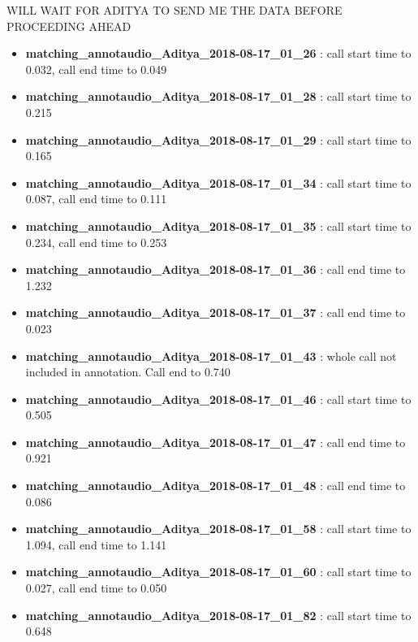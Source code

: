 \documentclass[11pt]{article}
\providecommand{\tightlist}{%
      \setlength{\itemsep}{0pt}\setlength{\parskip}{0pt}}
\begin{document}
WILL WAIT FOR ADITYA TO SEND ME THE DATA BEFORE PROCEEDING AHEAD

\begin{itemize}
\tightlist
\item
  \textbf{matching\_annotaudio\_Aditya\_2018-08-17\_01\_26} : call start
  time to 0.032, call end time to 0.049
\item
  \textbf{matching\_annotaudio\_Aditya\_2018-08-17\_01\_28} : call start
  time to 0.215
\item
  \textbf{matching\_annotaudio\_Aditya\_2018-08-17\_01\_29} : call start
  time to 0.165
\item
  \textbf{matching\_annotaudio\_Aditya\_2018-08-17\_01\_34} : call start
  time to 0.087, call end time to 0.111
\item
  \textbf{matching\_annotaudio\_Aditya\_2018-08-17\_01\_35} : call start
  time to 0.234, call end time to 0.253
\item
  \textbf{matching\_annotaudio\_Aditya\_2018-08-17\_01\_36} : call end
  time to 1.232
\item
  \textbf{matching\_annotaudio\_Aditya\_2018-08-17\_01\_37} : call end
  time to 0.023
\item
  \textbf{matching\_annotaudio\_Aditya\_2018-08-17\_01\_43} : whole call
  not included in annotation. Call end to 0.740
\item
  \textbf{matching\_annotaudio\_Aditya\_2018-08-17\_01\_46} : call start
  time to 0.505
\item
  \textbf{matching\_annotaudio\_Aditya\_2018-08-17\_01\_47} : call end
  time to 0.921
\item
  \textbf{matching\_annotaudio\_Aditya\_2018-08-17\_01\_48} : call end
  time to 0.086
\item
  \textbf{matching\_annotaudio\_Aditya\_2018-08-17\_01\_58} : call start
  time to 1.094, call end time to 1.141
\item
  \textbf{matching\_annotaudio\_Aditya\_2018-08-17\_01\_60} : call start
  time to 0.027, call end time to 0.050
\item
  \textbf{matching\_annotaudio\_Aditya\_2018-08-17\_01\_82} : call start
  time to 0.648
\end{itemize}
\end{document}
